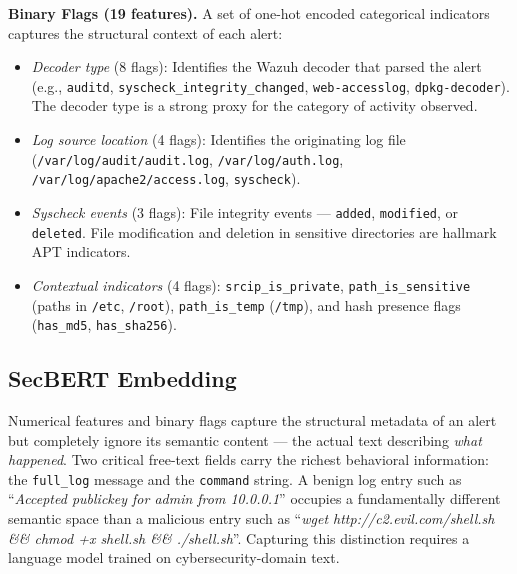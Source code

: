 \textbf{Binary Flags (19 features).} A set of one-hot encoded categorical indicators captures the structural context of each alert:
\begin{itemize}
    \item \textit{Decoder type} (8 flags): Identifies the Wazuh decoder that parsed the alert (e.g., \texttt{auditd}, \texttt{syscheck\_integrity\_changed}, \texttt{web-accesslog}, \texttt{dpkg-decoder}). The decoder type is a strong proxy for the category of activity observed.
    \item \textit{Log source location} (4 flags): Identifies the originating log file (\texttt{/var/log/audit/audit.log}, \texttt{/var/log/auth.log}, \texttt{/var/log/apache2/access.log}, \texttt{syscheck}).
    \item \textit{Syscheck events} (3 flags): File integrity events --- \texttt{added}, \texttt{modified}, or \texttt{deleted}. File modification and deletion in sensitive directories are hallmark APT indicators.
    \item \textit{Contextual indicators} (4 flags): \texttt{srcip\_is\_private}, \texttt{path\_is\_sensitive} (paths in \texttt{/etc}, \texttt{/root}), \texttt{path\_is\_temp} (\texttt{/tmp}), and hash presence flags (\texttt{has\_md5}, \texttt{has\_sha256}).
\end{itemize}

\subsection{SecBERT Embedding}
\label{subsec:secbert_embedding}

Numerical features and binary flags capture the structural metadata of an alert but completely ignore its semantic content --- the actual text describing \textit{what happened}. Two critical free-text fields carry the richest behavioral information: the \texttt{full\_log} message and the \texttt{command} string. A benign log entry such as ``\textit{Accepted publickey for admin from 10.0.0.1}'' occupies a fundamentally different semantic space than a malicious entry such as ``\textit{wget http://c2.evil.com/shell.sh \&\& chmod +x shell.sh \&\& ./shell.sh}''. Capturing this distinction requires a language model trained on cybersecurity-domain text.

